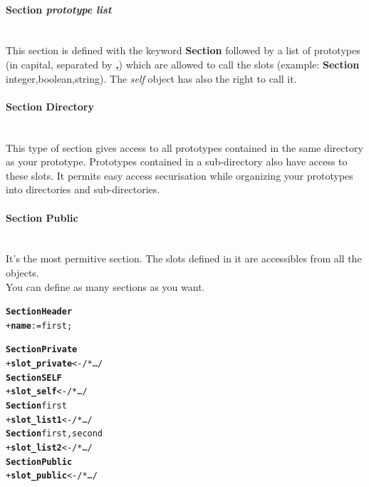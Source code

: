 \documentclass[11pt]{mybook}
\begin{document}
\paragraph{{\bf{}Section} {\it{}prototype list}} 
~\\
This section is defined with the keyword {\bf{}Section} followed by a list of prototypes (in capital, separated by {\bf,}) which are allowed to call the slots (example: {\bf{}Section} {\sc{}integer,boolean,string}). The {\it{}self} object has also the right to call it.

\paragraph{{\bf{}Section Directory}} 
~\\
This type of section gives access to all prototypes contained in the same directory as your prototype.
Prototypes contained in a sub-directory also have access to these slots. It permits easy access securisation
while organizing your prototypes into directories and sub-directories.

\paragraph{{\bf{}Section Public}}  
~\\
It's the most permitive section. The slots defined in it are accessibles from all the objects.\\

You can define as many sections as you want.

\begin{alltt} 
{\bf{}Section Header}
  + {\bf{}name} := {\sc{}first};

{\bf{}Section Private}
  + {\bf{}slot\_private} <- /* \ldots */
{\bf{}Section SELF}
  + {\bf{}slot\_self} <- /* \ldots */
{\bf{}Section} {\sc{}first}
  + {\bf{}slot\_list1} <- /* \ldots */
{\bf{}Section} {\sc{}first,second}
  + {\bf{}slot\_list2} <- /* \ldots */
{\bf{}Section Public}
  + {\bf{}slot\_public}  <- /* \ldots */
\end{alltt}
\end{document}
